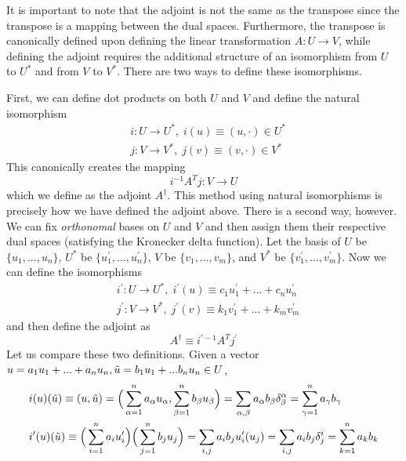 \documentclass{article}
\begin{document}
    It is important to note that the adjoint is not the same as the transpose since the transpose is a mapping between the dual spaces. Furthermore, the transpose is canonically defined upon defining the linear transformation $A: U \longrightarrow V$, while defining the adjoint requires the additional structure of an isomorphism from $U$ to $U^*$ and from $V$ to $V^*$. There are two ways to define these isomorphisms. 

    First, we can define dot products on both $U$ and $V$ and define the natural isomorphism 
    \begin{align*}
        &i: U \longrightarrow U^*, \; i(u) \equiv (u, \cdot) \in U^*\\
        &j: V \longrightarrow V^*, \; j(v) \equiv (v, \cdot) \in V^*
    \end{align*}
    This canonically creates the mapping 
    \[i^{-1} A^T j: V \longrightarrow U\]
    which we define as the adjoint $A^\dagger$. This method using natural isomorphisms is precisely how we have defined the adjoint above. There is a second way, however. We can fix \textit{orthonomal} bases on $U$ and $V$ and then assign them their respective dual spaces (satisfying the Kronecker delta function). Let the basis of $U$ be $\{u_1, ..., u_n\}$, $U^*$ be $\{u_1^\prime, ..., u_n^\prime\}$, $V$ be $\{v_1, ..., v_m\}$, and $V^*$ be $\{v_1^\prime, ..., v_m^\prime\}$. Now we can define the isomorphisms 
    \begin{align*}
        & i^\prime: U \longrightarrow U^*, \; i^\prime (u) \equiv c_1 u_1^\prime + ... + c_n u_n^\prime \\
        & j^\prime: V \longrightarrow V^*, \; j^\prime (v) \equiv k_1 v_1^\prime + ... + k_m v_m^\prime
    \end{align*}
    and then define the adjoint as 
    \[A^\dagger \equiv i^{\prime -1} A^T j^\prime\]
    Let us compare these two definitions. Given a vector $u = a_1 u_1 + ... + a_n u_n, \Tilde{u} = b_1 u_1 + ... b_n u_n \in U$, 
    \begin{align*}
        &i(u)(\Tilde{u}) \equiv (u, \Tilde{u}) = \Big(\sum_{\alpha = 1}^n a_\alpha u_\alpha, \sum_{\beta = 1}^n b_\beta u_\beta \Big) = \sum_{\alpha, \beta} a_\alpha b_\beta \delta^\alpha_\beta = \sum_{\gamma=1}^n a_\gamma b_\gamma \\
        &i^\prime(u)(\Tilde{u}) \equiv \Big(\sum_{i=1}^n a_i u_i^\prime \Big) \Big( \sum_{j=1}^n b_j u_j \Big) = \sum_{i, j} a_i b_j u_i^\prime (u_j) = \sum_{i, j} a_i b_j \delta^i_j = \sum_{k=1}^n a_k b_k
    \end{align*}
\end{document}
